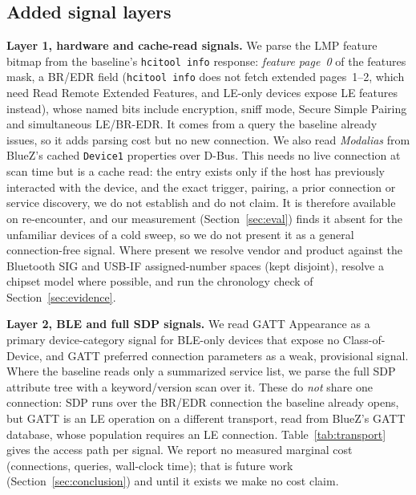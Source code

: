 \documentclass[conference]{IEEEtran}
\begin{document}
\subsection{Added signal layers}\label{sec:layers}
\textbf{Layer 1, hardware and cache-read signals.}
We parse the LMP feature bitmap from the baseline's \texttt{hcitool info}
response: \emph{feature page~0} of the features mask, a BR/EDR field
(\texttt{hcitool info} does not fetch extended pages~1--2, which need Read
Remote Extended Features, and LE-only devices expose LE features instead),
whose named bits include encryption, sniff mode, Secure Simple Pairing and
simultaneous LE/BR-EDR. It comes from a query the baseline already issues, so
it adds parsing cost but no new connection. We also read \emph{Modalias} from
BlueZ's cached \texttt{Device1} properties over D-Bus. This needs no live
connection at scan time but is a cache read: the entry exists only if the
host has previously interacted with the device, and the exact trigger,
pairing, a prior connection or service discovery, we do not establish and do
not claim. It is therefore available on re-encounter, and our measurement
(Section~\ref{sec:eval}) finds it absent for the unfamiliar devices of a cold
sweep, so we do not present it as a general connection-free signal. Where
present we resolve vendor and product against the Bluetooth SIG and USB-IF
assigned-number spaces (kept disjoint), resolve a chipset model where
possible, and run the chronology check of Section~\ref{sec:evidence}.

\textbf{Layer 2, BLE and full SDP signals.}
We read GATT Appearance as a primary device-category signal for BLE-only
devices that expose no Class-of-Device, and GATT preferred connection
parameters as a weak, provisional signal. Where the baseline reads only a
summarized service list, we parse the full SDP attribute tree with a
keyword/version scan over it. These do \emph{not} share one connection: SDP
runs over the BR/EDR connection the baseline already opens, but GATT is an LE
operation on a different transport, read from BlueZ's GATT database, whose
population requires an LE connection. Table~\ref{tab:transport} gives the
access path per signal. We report no measured marginal cost (connections,
queries, wall-clock time); that is future work
(Section~\ref{sec:conclusion}) and until it exists we make no cost claim.
\end{document}
